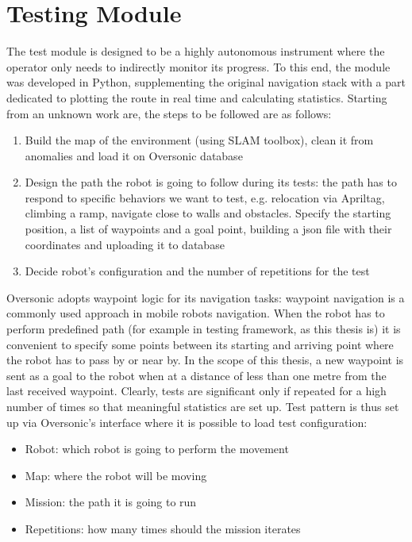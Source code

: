 \section{Testing Module}
\label{section:test}
The test module is designed to be a highly autonomous instrument where the operator only needs to indirectly monitor its progress.
To this end, the module was developed in Python, supplementing the original navigation stack with a part dedicated to plotting the route in real time and calculating statistics.
Starting from an unknown work are, the steps to be followed are as follows:
\begin{enumerate}
    \item Build the map of the environment (using SLAM toolbox), clean it from anomalies and load it on Oversonic database
    \item Design the path the robot is going to follow during its tests: the  path has to respond to specific behaviors we want to test, e.g. relocation via Apriltag, climbing a ramp, navigate close to walls and obstacles.
    Specify the starting position, a list of waypoints and a goal point, building a json file with their coordinates and uploading it to database
    \item Decide robot's configuration and the number of repetitions for the test
\end{enumerate}
Oversonic adopts waypoint logic for its navigation tasks: waypoint navigation is a commonly used approach in mobile robots navigation.
When the robot has to perform predefined path (for example in testing framework, as this thesis is) it is convenient to specify some points between its starting and arriving point where the robot has to pass by or near by.  
In the scope of this thesis, a  new waypoint is sent as a goal to the robot when at a distance of less than one metre from the last received waypoint.
Clearly, tests are significant only if repeated for a high number of times so that meaningful statistics are set up.
Test pattern is thus set up via Oversonic's interface where it is possible to load test configuration:
\begin{itemize}
    \item Robot: which robot is going to perform the movement
    \item Map: where the robot will be moving
    \item Mission: the path it is going to run
    \item Repetitions: how many times should the mission iterates
\end{itemize}

